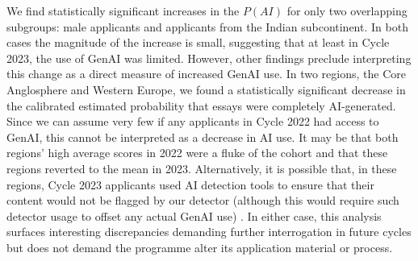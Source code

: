 We find statistically significant increases in the $P(AI)$ for only two overlapping subgroups: male applicants and applicants from the Indian subcontinent. In both cases the magnitude of the increase is small, suggesting that at least in Cycle 2023, the use of GenAI was limited. However, other findings preclude interpreting this change as a direct measure of increased GenAI use. In two regions, the Core Anglosphere and Western Europe, we found a statistically significant decrease in the calibrated estimated probability that essays were completely AI-generated. Since we can assume very few if any applicants in Cycle 2022 had access to GenAI, this cannot be interpreted as a decrease in AI use. It may be that both regions' high average scores in 2022 were a fluke of the cohort and that these regions reverted to the mean in 2023. Alternatively, it is possible that, in these regions, Cycle 2023 applicants used AI detection tools to ensure that their content would not be flagged by our detector (although this would require such detector usage to offset any actual GenAI use) \cite{gptzero_gptzero_2023}. In either case, this analysis surfaces interesting discrepancies demanding further interrogation in future cycles but does not demand the programme alter its application material or process.


